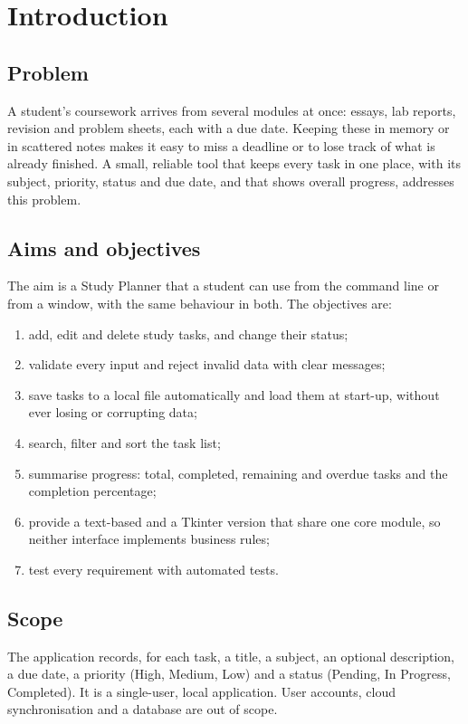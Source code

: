 \documentclass[11pt,a4paper]{article}
\begin{document}
\clearpage
\tableofcontents
\clearpage
{}

\section{Introduction}

\subsection{Problem}
A student's coursework arrives from several modules at once: essays, lab
reports, revision and problem sheets, each with a due date. Keeping these in
memory or in scattered notes makes it easy to miss a deadline or to lose
track of what is already finished. A small, reliable tool that keeps every
task in one place, with its subject, priority, status and due date, and that
shows overall progress, addresses this problem.

\subsection{Aims and objectives}
The aim is a Study Planner that a student can use from the command line or
from a window, with the same behaviour in both. The objectives are:
\begin{enumerate}
  \item add, edit and delete study tasks, and change their status;
  \item validate every input and reject invalid data with clear messages;
  \item save tasks to a local file automatically and load them at start-up,
        without ever losing or corrupting data;
  \item search, filter and sort the task list;
  \item summarise progress: total, completed, remaining and overdue tasks and
        the completion percentage;
  \item provide a text-based and a Tkinter version that share one core
        module, so neither interface implements business rules;
  \item test every requirement with automated tests.
\end{enumerate}

\subsection{Scope}
The application records, for each task, a title, a subject, an optional
description, a due date, a priority (High, Medium, Low) and a status
(Pending, In Progress, Completed). It is a single-user, local application.
User accounts, cloud synchronisation and a database are out of scope.
\end{document}
